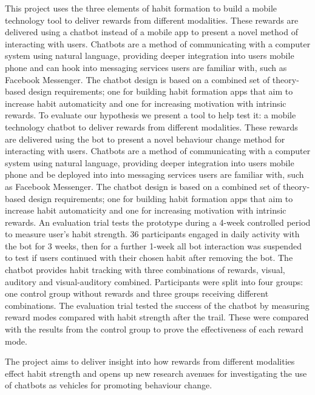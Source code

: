 \newline
This project uses the three elements of habit formation to build a mobile technology tool to deliver rewards from different modalities.
These rewards are delivered using a chatbot instead of a mobile app to present a novel method of interacting with users.
Chatbots are a method of communicating with a computer system using natural language, providing deeper integration into users mobile phone and
can hook into messaging services users are familiar with, such as Facebook Messenger.
The chatbot design is based on a combined set of theory-based design requirements;
one for building habit formation apps that aim to increase habit automaticity and one for increasing motivation with intrinsic rewards.\newline
\newline
To evaluate our hypothesis we present a tool to help test it: a mobile technology chatbot to deliver rewards from different modalities.
These rewards are delivered using the bot to present a novel behaviour change method for interacting with users.
Chatbots are a method of communicating with a computer system using natural language, providing deeper integration into users mobile phone and be deployed into into messaging services users are familiar with, such as Facebook Messenger.
The chatbot design is based on a combined set of theory-based design requirements;
one for building habit formation apps that aim to increase habit automaticity and one for increasing motivation with intrinsic rewards.\newline
\newline
An evaluation trial tests the prototype during a 4-week controlled period to measure user's habit strength.
36 participants engaged in daily activity with the bot for 3 weeks, then for a further 1-week all bot interaction was suspended to test if users continued with their chosen habit after removing the bot.
The chatbot provides habit tracking with three combinations of rewards, visual, auditory and visual-auditory combined.
Participants were split into four groups: one control group without rewards and three groups receiving different combinations.
The evaluation trial tested the success of the chatbot by measuring reward modes compared with habit strength after the trail. These were compared with the results from the control group to prove the effectiveness of each reward mode.


The project aims to deliver insight into how rewards from different modalities effect habit strength and opens up new research avenues for investigating the use of chatbots as
vehicles for promoting behaviour change.

